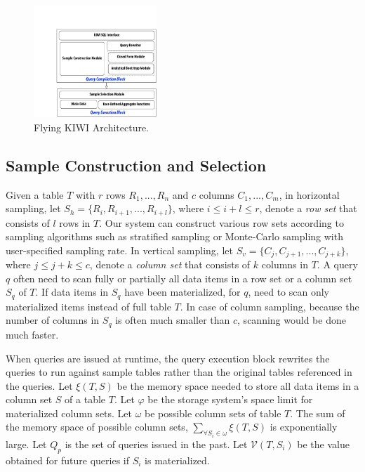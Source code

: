 \documentclass{sig-alternate-05-2015}
\begin{document}
\begin{figure}[htb]
        \centering
        \includegraphics[width=0.412\textwidth]{sys-architecture.pdf}
        \caption{Flying KIWI Architecture.}
        \label{fig:architecture}
\end{figure}

\subsection{Sample Construction and Selection}
Given a table $T$ with $r$ rows $R_1, ..., R_n$ and $c$ columns $C_1, ..., C_m$, 
in horizontal sampling, let $S_h=\{R_i, R_{i+1}, ..., R_{i+l}\}$, where $ i \leq i+l \leq r$, denote a \textit{row set}  that consists of $l$ rows in $T$. Our system can construct various row sets according to  sampling algorithms such as stratified sampling \cite{Chaudhuri:2007} or Monte-Carlo sampling with user-specified sampling rate.
In vertical sampling, let $S_v=\{C_j, C_{j+1}, ..., C_{j+k}\}$, where $ j \leq j+k \leq c$, denote a \textit{column set} that consists of $k$ columns in $T$. 
A query $q$ often need to scan fully or partially all data items in a row set or a column set $S_q$ of $T$. 
If data items in $S_q$ have been materialized, for $q$, need to scan only materialized items instead of full table $T$. 
In case of column sampling, because the number of columns in $S_q$ is often much smaller than $c$, scanning would be done much faster.

When queries are issued at runtime, the query execution block rewrites the queries to run against sample tables rather than the original tables referenced in the queries.
Let $\xi(T, S)$ be the memory space needed to store all data items in a column set $S$ of a table $T$.
Let $\varphi$ be the storage system's space limit for materialized column sets.
Let $\omega$ be possible column sets of table $T$. 
The sum of the memory space of possible column sets, $\sum_{\forall S_i \in \omega} \xi(T, S)$ is exponentially large.
Let $Q_p$ is the set of queries issued in the past.
Let $\mathcal{V}(T, S_i)$ be the value obtained for future queries if $S_i$ is materialized.\\
\end{document}

